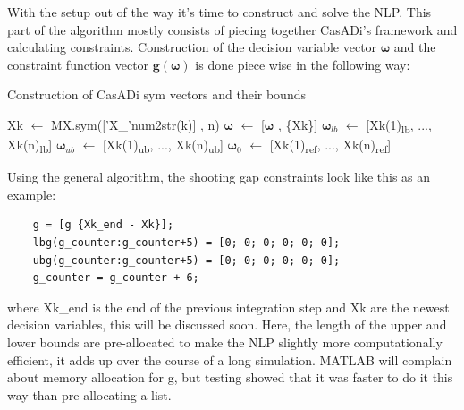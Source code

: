 With the setup out of the way it's time to construct and solve the \gls{NLP}. This part of the algorithm
mostly consists of piecing together CasADi's framework and calculating constraints. Construction of the decision variable vector $\bm{\omega}$ and the constraint function
vector $\textbf{g}(\bm{\omega})$ is done piece wise in the following way:
\begin{algorithm}[ht]
    \caption{Construction of CasADi sym vectors and their bounds} \label{ALG: general CasADi sym}
    \begin{algorithmic}
        \State Xk $\gets$ MX.sym(['X\_'num2str(k)] , n) 
        \State $\bm{\omega}$ $\gets$ [$\bm{\omega}$ , \{Xk\}]
        \State $\bm{\omega}_{lb}$ $\gets$ [Xk(1)\textsubscript{lb}, ..., Xk(n)\textsubscript{lb}]
        \State $\bm{\omega}_{ub}$ $\gets$ [Xk(1)\textsubscript{ub}, ..., Xk(n)\textsubscript{ub}]
        \State $\bm{\omega}_0$ $\gets$ [Xk(1)\textsubscript{ref}, ..., Xk(n)\textsubscript{ref}] 
    \end{algorithmic}
\end{algorithm}

Using the general algorithm, the shooting gap constraints look like this as an example:
\begin{lstlisting}
    g = [g {Xk_end - Xk}];
    lbg(g_counter:g_counter+5) = [0; 0; 0; 0; 0; 0];
    ubg(g_counter:g_counter+5) = [0; 0; 0; 0; 0; 0];
    g_counter = g_counter + 6;
\end{lstlisting}
where Xk\_end is the end of the previous integration step and Xk are the newest decision variables, this will be discussed soon.
Here, the length of the upper and lower bounds are pre-allocated to make the \gls{NLP} slightly more computationally efficient,
it adds up over the course of a long simulation. MATLAB will complain about memory allocation for g, 
but testing showed that it was faster to do it this way than pre-allocating a list. 



